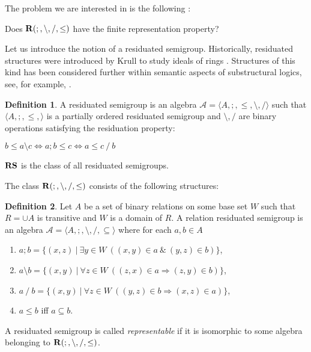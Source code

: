 \documentclass[a4paper]{article}
\theoremstyle{definition}
\newtheorem{definition}{Definition}
\theoremstyle{theorem}
\theoremstyle{proposition}
\theoremstyle{lemma}
\theoremstyle{ex}
\theoremstyle{corollary}
\theoremstyle{claim}
\begin{document}
The problem we are interested in is the following \cite[Problem 19.17]{hirsch2002relation}:

\begin{center}
  Does ${\bf R}(;, \setminus, /, \leq)$ have the finite representation property?
\end{center}

Let us introduce the notion of a residuated semigroup. Historically, residuated structures were introduced by Krull to study ideals of rings \cite{krull1968idealtheorie}. Structures of this kind has been considered further within semantic aspects of substructural logics, see, for example, \cite{jipsen2002survey}.

\begin{definition}
  A residuated semigroup is an algebra $\mathcal{A} = \langle A, ;, \leq, \setminus, / \rangle$ such that $\langle A, ;, \leq, \rangle$ is a partially ordered residuated semigroup and $\setminus, /$ are binary operations satisfying the residuation property:

  \begin{center}
    $b \leq a \setminus c \Leftrightarrow a ; b \leq c \Leftrightarrow a \leq c \: / \: b$
  \end{center}
  ${\bf RS}$ is the class of all residuated semigroups.
\end{definition}

The class ${\bf R}(;, \setminus, /, \leq)$ consists of the following structures:

\begin{definition} \label{rrs}
  Let $A$ be a set of binary relations on some base set $W$ such that $R = \cup A$ is transitive and $W$ is a domain of $R$. A relation residuated semigroup is an algebra $\mathcal{A} = \langle A, ;, \setminus, /, \subseteq \rangle$ where for each $a, b \in A$
  \begin{enumerate}
    \item $a ; b = \{ (x, z) \: | \: \exists y \in W \: ((x, y) \in a \: \& \: (y, z) \in b) \}$,
    \item $a \setminus b = \{ (x, y) \: | \: \forall z \in W \: ((z, x) \in a \Rightarrow (z, y) \in b)\}$,
    \item $a \: / \: b = \{ (x, y) \: | \: \forall z \in W \: ((y, z) \in b \Rightarrow (x, z) \in a)\}$,
    \item $a \leq b$ iff $a \subseteq b$.
  \end{enumerate}
\end{definition}
A residuated semigroup is called \emph{representable} if it is isomorphic to some algebra belonging to ${\bf R}(;, \setminus, /, \leq)$.
\end{document}
